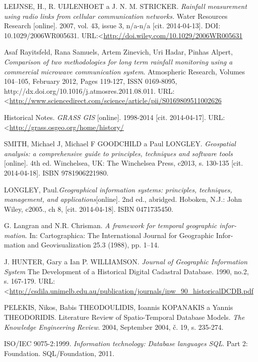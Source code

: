 \documentclass[a4paper,12pt,oneside]{report}
\begin{document}
\begin{thebibliography}{99}
LEIJNSE, H., R. UIJLENHOET a J. N. M. STRICKER. \textit{Rainfall measurement using radio links from cellular communication networks.} Water Resources Research [online]. 2007, vol. 43, issue 3, n/a-n/a [cit. 2014-04-13]. DOI: 10.1029/2006WR005631. URL:\textless\url {http://doi.wiley.com/10.1029/2006WR005631}

Asaf Rayitsfeld, Rana Samuels, Artem Zinevich, Uri Hadar, Pinhas Alpert, \textit{Comparison of two methodologies for long term rainfall monitoring using a commercial microwave communication system}. Atmospheric Research, Volumes 104–105, February 2012, Pages 119-127, ISSN 0169-8095, http://dx.doi.org/10.1016/j.atmosres.2011.08.011.
URL:\textless\url {http://www.sciencedirect.com/science/article/pii/S0169809511002626}

Historical Notes. \textit{GRASS GIS} [online]. 1998-2014 [cit. 2014-04-17]. URL:\textless\url {http://grass.osgeo.org/home/history/}

SMITH, Michael J, Michael F GOODCHILD a Paul LONGLEY. \textit{Geospatial analysis: a comprehensive guide to principles, techniques and software tools} [online]. 4th ed. Winchelsea, UK: The Winchelsea Press, c2013, s. 130-135 [cit. 2014-04-18]. ISBN 9781906221980.

LONGLEY, Paul.\textit{Geographical information systems: principles, techniques, management, and applications}[online]. 2nd ed., abridged. Hoboken, N.J.: John Wiley, c2005., ch 8, [cit. 2014-04-18]. ISBN 0471735450.

G. Langran and N.R. Chrisman. \textit{A framework for temporal geographic infor-
mation}. In: Cartographica: The International Journal for Geographic Infor-
mation and Geovisualization 25.3 (1988), pp. 1–14.

J. HUNTER, Gary a Ian P. WILLIAMSON. \textit{Journal of Geographic Information System} The Development of a Historical Digital Cadastral Database. 1990, no.2, s. 167-179. URL:\textless\url {http://csdila.unimelb.edu.au/publication/journals/ipw_90_historicalDCDB.pdf}


PELEKIS, Nikos, Babis THEODOULIDIS, Ioannis KOPANAKIS a Yannis THEODORIDIS. Literature Review of Spatio-Temporal Database Models. \textit{The Knowledge Engineering Review}. 2004, September 2004, č. 19, s. 235-274. 

ISO/IEC 9075-2:1999. \textit{Information technology: Database languages SQL}. Part 2: Foundation. SQL/Foundation, 2011. 


\end{thebibliography}
\end{document}

